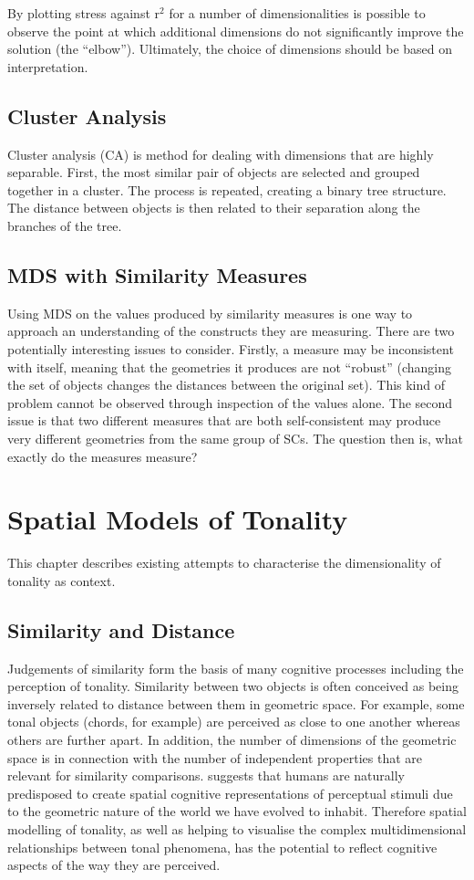 \documentclass{article}
\begin{document}
By plotting stress against r$^2$ for a number of dimensionalities is
possible to observe the point at which additional dimensions do not
significantly improve the solution (the ``elbow''). Ultimately, the
choice of dimensions should be based on interpretation.
\subsection{Cluster Analysis}
\label{sec-4-2}

Cluster analysis (CA) is method for dealing with dimensions that are
highly separable. First, the most similar pair of objects are selected
and grouped together in a cluster. The process is repeated, creating a
binary tree structure. The distance between objects is then related to
their separation along the branches of the tree.
\subsection{MDS with Similarity Measures}
\label{sec-4-3}

Using MDS on the values produced by similarity measures is one way to
approach an understanding of the constructs they are measuring. There
are two potentially interesting issues to consider. Firstly, a measure
may be inconsistent with itself, meaning that the geometries it
produces are not ``robust'' (changing the set of objects changes the
distances between the original set). This kind of problem cannot be
observed through inspection of the values alone. The second issue is
that two different measures that are both self-consistent may produce
very different geometries from the same group of SCs. The question
then is, what exactly do the measures measure?
\section{Spatial Models of Tonality}
\label{sec-5}

This chapter describes existing attempts to characterise the
dimensionality of tonality as context.
\subsection{Similarity and Distance}
\label{sec-5-1}

Judgements of similarity form the basis of many cognitive processes
including the perception of tonality. Similarity between two objects
is often conceived as being inversely related to distance between them
in geometric space. For example, some tonal objects (chords, for
example) are perceived as close to one another whereas others are
further apart. In addition, the number of dimensions of the geometric
space is in connection with the number of independent properties that
are relevant for similarity comparisons. \citet{Gardenfors1995}
suggests that humans are naturally predisposed to create spatial
cognitive representations of perceptual stimuli due to the geometric
nature of the world we have evolved to inhabit. Therefore spatial
modelling of tonality, as well as helping to visualise the complex
multidimensional relationships between tonal phenomena, has the
potential to reflect cognitive aspects of the way they are perceived.
\end{document}
